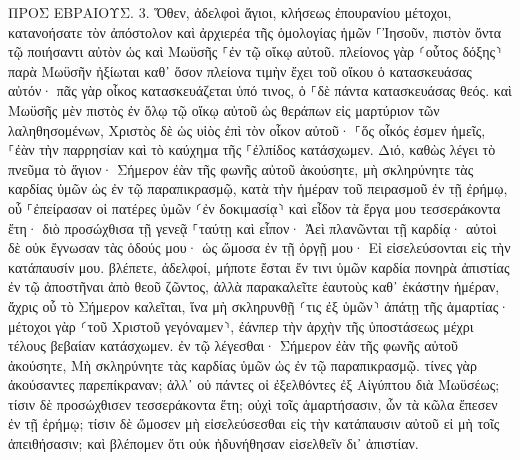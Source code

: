 \documentclass[twoside, 9pt]{extreport}
\begin{document}
ΠΡΟΣ ΕΒΡΑΙΟΥΣ.
3.
Ὅθεν, ἀδελφοὶ ἅγιοι, κλήσεως ἐπουρανίου μέτοχοι, κατανοήσατε τὸν ἀπόστολον καὶ ἀρχιερέα τῆς ὁμολογίας ἡμῶν ⸀Ἰησοῦν, 
πιστὸν ὄντα τῷ ποιήσαντι αὐτὸν ὡς καὶ Μωϋσῆς ⸀ἐν τῷ οἴκῳ αὐτοῦ. 
πλείονος γὰρ ⸂οὗτος δόξης⸃ παρὰ Μωϋσῆν ἠξίωται καθ᾽ ὅσον πλείονα τιμὴν ἔχει τοῦ οἴκου ὁ κατασκευάσας αὐτόν· 
πᾶς γὰρ οἶκος κατασκευάζεται ὑπό τινος, ὁ ⸀δὲ πάντα κατασκευάσας θεός. 
καὶ Μωϋσῆς μὲν πιστὸς ἐν ὅλῳ τῷ οἴκῳ αὐτοῦ ὡς θεράπων εἰς μαρτύριον τῶν λαληθησομένων, 
Χριστὸς δὲ ὡς υἱὸς ἐπὶ τὸν οἶκον αὐτοῦ· ⸀ὅς οἶκός ἐσμεν ἡμεῖς, ⸀ἐὰν τὴν παρρησίαν καὶ τὸ καύχημα τῆς ⸀ἐλπίδος κατάσχωμεν. 
Διό, καθὼς λέγει τὸ πνεῦμα τὸ ἅγιον· Σήμερον ἐὰν τῆς φωνῆς αὐτοῦ ἀκούσητε, 
μὴ σκληρύνητε τὰς καρδίας ὑμῶν ὡς ἐν τῷ παραπικρασμῷ, κατὰ τὴν ἡμέραν τοῦ πειρασμοῦ ἐν τῇ ἐρήμῳ, 
οὗ ⸀ἐπείρασαν οἱ πατέρες ὑμῶν ⸂ἐν δοκιμασίᾳ⸃ καὶ εἶδον τὰ ἔργα μου 
τεσσεράκοντα ἔτη· διὸ προσώχθισα τῇ γενεᾷ ⸀ταύτῃ καὶ εἶπον· Ἀεὶ πλανῶνται τῇ καρδίᾳ· αὐτοὶ δὲ οὐκ ἔγνωσαν τὰς ὁδούς μου· 
ὡς ὤμοσα ἐν τῇ ὀργῇ μου· Εἰ εἰσελεύσονται εἰς τὴν κατάπαυσίν μου. 
βλέπετε, ἀδελφοί, μήποτε ἔσται ἔν τινι ὑμῶν καρδία πονηρὰ ἀπιστίας ἐν τῷ ἀποστῆναι ἀπὸ θεοῦ ζῶντος, 
ἀλλὰ παρακαλεῖτε ἑαυτοὺς καθ᾽ ἑκάστην ἡμέραν, ἄχρις οὗ τὸ Σήμερον καλεῖται, ἵνα μὴ σκληρυνθῇ ⸂τις ἐξ ὑμῶν⸃ ἀπάτῃ τῆς ἁμαρτίας· 
μέτοχοι γὰρ ⸂τοῦ Χριστοῦ γεγόναμεν⸃, ἐάνπερ τὴν ἀρχὴν τῆς ὑποστάσεως μέχρι τέλους βεβαίαν κατάσχωμεν. 
ἐν τῷ λέγεσθαι· Σήμερον ἐὰν τῆς φωνῆς αὐτοῦ ἀκούσητε, Μὴ σκληρύνητε τὰς καρδίας ὑμῶν ὡς ἐν τῷ παραπικρασμῷ. 
τίνες γὰρ ἀκούσαντες παρεπίκραναν; ἀλλ᾽ οὐ πάντες οἱ ἐξελθόντες ἐξ Αἰγύπτου διὰ Μωϋσέως; 
τίσιν δὲ προσώχθισεν τεσσεράκοντα ἔτη; οὐχὶ τοῖς ἁμαρτήσασιν, ὧν τὰ κῶλα ἔπεσεν ἐν τῇ ἐρήμῳ; 
τίσιν δὲ ὤμοσεν μὴ εἰσελεύσεσθαι εἰς τὴν κατάπαυσιν αὐτοῦ εἰ μὴ τοῖς ἀπειθήσασιν; 
καὶ βλέπομεν ὅτι οὐκ ἠδυνήθησαν εἰσελθεῖν δι᾽ ἀπιστίαν. 
\end{document}
